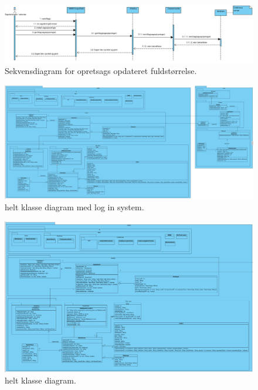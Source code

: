 \begin{landscape}
\begin{figure}[hbt!]
  \includegraphics[width=\linewidth]{./PNG/analyse/opretSag2.PNG} 
  \caption{Sekvensdiagram for opretsags opdateret fuldstørrelse.}
  \label{fig:2fopretsag}
\end{figure}
\begin{figure}[hbt!]
  \includegraphics[width=\linewidth]{./PNG/design/opdateretKlassediagram.PNG} 
  \caption{helt klasse diagram med log in system.}
  \label{fig:opklassemedlog}
\end{figure}
\begin{figure}[hbt!]
  \includegraphics[width=\linewidth]{./PNG/design/mmmiKlassediagramOpdateret.PNG} 
  \caption{helt klasse diagram.}
  \label{fig:opklasse}
\end{figure}
\begin{figure}

\end{figure}
\end{landscape}

